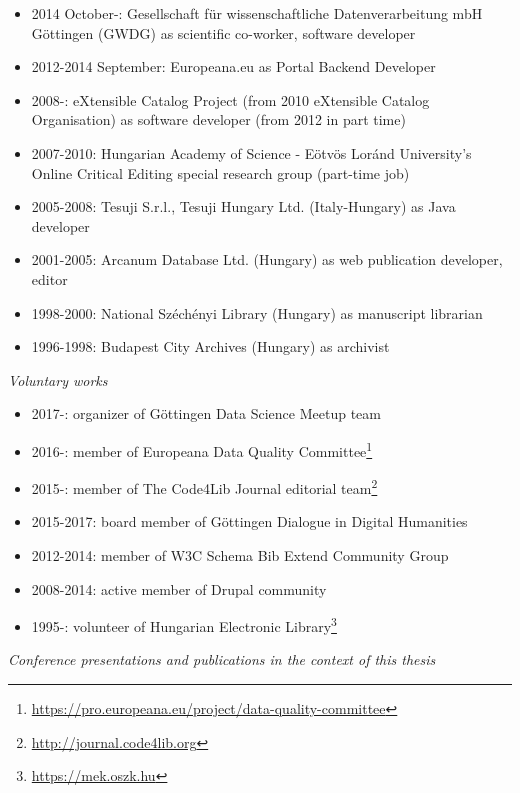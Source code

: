 \begin{itemize}
 \setlength{\parskip}{0pt}
 \setlength{\itemsep}{0pt plus 1pt}
\item 2014 October-: Gesellschaft für wissenschaftliche Datenverarbeitung mbH Göttingen (GWDG) as scientific co-worker, software developer
\item 2012-2014 September: Europeana.eu as Portal Backend Developer
\item 2008-: eXtensible Catalog Project (from 2010 eXtensible Catalog Organisation) as software developer (from 2012 in part time)
\item 2007-2010: Hungarian Academy of Science - Eötvös Loránd University's Online Critical Editing special research group (part-time job)
\item 2005-2008: Tesuji S.r.l., Tesuji Hungary Ltd. (Italy-Hungary) as Java developer
\item 2001-2005: Arcanum Database Ltd. (Hungary) as web publication developer, editor
\item 1998-2000: National Széchényi Library (Hungary) as manuscript librarian
\item 1996-1998: Budapest City Archives (Hungary) as archivist
\end{itemize}

\emph{Voluntary works}
\begin{itemize}
 \setlength{\parskip}{0pt}
 \setlength{\itemsep}{0pt plus 1pt}
\item 2017-: organizer of Göttingen Data Science Meetup team
\item 2016-: member of Europeana Data Quality Committee\footnote{\url{https://pro.europeana.eu/project/data-quality-committee}}
\item 2015-: member of The Code4Lib Journal editorial team\footnote{\url{http://journal.code4lib.org}}
\item 2015-2017: board member of Göttingen Dialogue in Digital Humanities
\item 2012-2014: member of W3C Schema Bib Extend Community Group
\item 2008-2014: active member of Drupal community
\item 1995-: volunteer of Hungarian Electronic Library\footnote{\url{https://mek.oszk.hu}}
\end{itemize}

\emph{Conference presentations and publications in the context of this thesis}

